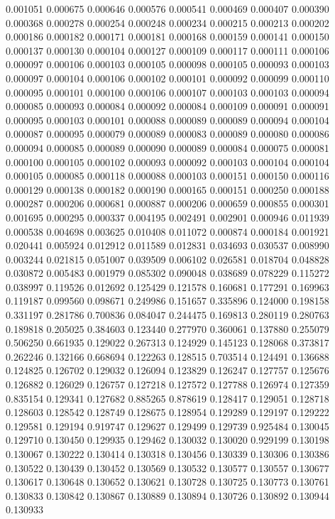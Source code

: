 0.001051
0.000675
0.000646
0.000576
0.000541
0.000469
0.000407
0.000390
0.000368
0.000278
0.000254
0.000248
0.000234
0.000215
0.000213
0.000202
0.000186
0.000182
0.000171
0.000181
0.000168
0.000159
0.000141
0.000150
0.000137
0.000130
0.000104
0.000127
0.000109
0.000117
0.000111
0.000106
0.000097
0.000106
0.000103
0.000105
0.000098
0.000105
0.000093
0.000103
0.000097
0.000104
0.000106
0.000102
0.000101
0.000092
0.000099
0.000110
0.000095
0.000101
0.000100
0.000106
0.000107
0.000103
0.000103
0.000094
0.000085
0.000093
0.000084
0.000092
0.000084
0.000109
0.000091
0.000091
0.000095
0.000103
0.000101
0.000088
0.000089
0.000089
0.000094
0.000104
0.000087
0.000095
0.000079
0.000089
0.000083
0.000089
0.000080
0.000086
0.000094
0.000085
0.000089
0.000090
0.000089
0.000084
0.000075
0.000081
0.000100
0.000105
0.000102
0.000093
0.000092
0.000103
0.000104
0.000104
0.000105
0.000085
0.000118
0.000088
0.000103
0.000151
0.000150
0.000116
0.000129
0.000138
0.000182
0.000190
0.000165
0.000151
0.000250
0.000188
0.000287
0.000206
0.000681
0.000887
0.000206
0.000659
0.000855
0.000301
0.001695
0.000295
0.000337
0.004195
0.002491
0.002901
0.000946
0.011939
0.000538
0.004698
0.003625
0.010408
0.011072
0.000874
0.000184
0.001921
0.020441
0.005924
0.012912
0.011589
0.012831
0.034693
0.030537
0.008990
0.003244
0.021815
0.051007
0.039509
0.006102
0.026581
0.018704
0.048828
0.030872
0.005483
0.001979
0.085302
0.090048
0.038689
0.078229
0.115272
0.038997
0.119526
0.012692
0.125429
0.121578
0.160681
0.177291
0.169963
0.119187
0.099560
0.098671
0.249986
0.151657
0.335896
0.124000
0.198158
0.331197
0.281786
0.700836
0.084047
0.244475
0.169813
0.280119
0.280763
0.189818
0.205025
0.384603
0.123440
0.277970
0.360061
0.137880
0.255079
0.506250
0.661935
0.129022
0.267313
0.124929
0.145123
0.128068
0.373817
0.262246
0.132166
0.668694
0.122263
0.128515
0.703514
0.124491
0.136688
0.124825
0.126702
0.129032
0.126094
0.123829
0.126247
0.127757
0.125676
0.126882
0.126029
0.126757
0.127218
0.127572
0.127788
0.126974
0.127359
0.835154
0.129341
0.127682
0.885265
0.878619
0.128417
0.129051
0.128718
0.128603
0.128542
0.128749
0.128675
0.128954
0.129289
0.129197
0.129222
0.129581
0.129194
0.919747
0.129627
0.129499
0.129739
0.925484
0.130045
0.129710
0.130450
0.129935
0.129462
0.130032
0.130020
0.929199
0.130198
0.130067
0.130222
0.130414
0.130318
0.130456
0.130339
0.130306
0.130386
0.130522
0.130439
0.130452
0.130569
0.130532
0.130577
0.130557
0.130677
0.130617
0.130648
0.130652
0.130621
0.130728
0.130725
0.130773
0.130761
0.130833
0.130842
0.130867
0.130889
0.130894
0.130726
0.130892
0.130944
0.130933
